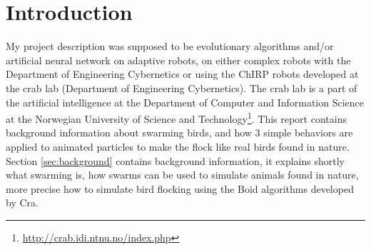 \section{Introduction}
\label{sec:intro}
My project description was supposed to be evolutionary algorithms and/or artificial neural network on adaptive robots, on either complex robots with the Department of Engineering Cybernetics or using the ChIRP robots developed at the crab lab (Department of Engineering Cybernetics). The crab lab is a part of the artificial intelligence at the Department of Computer and Information Science at the Norwegian University of Science and Technology\footnote{\href{http://crab.idi.ntnu.no/index.php}{http://crab.idi.ntnu.no/index.php}}.
This report contains background information about swarming birds, and how 3 simple behaviors are applied to animated particles to make the flock like real birds found in nature.
Section \ref{sec:background} contains background information, it explains shortly what swarming is, how swarms can be used to simulate animals found in nature, more precise how to simulate bird flocking using the Boid algorithms developed by Cra. 
